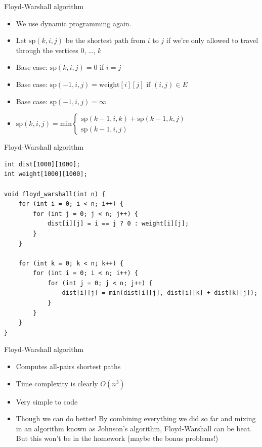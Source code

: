 \documentclass{beamer}
\begin{document}
\begin{frame}[plain]{Floyd-Warshall algorithm}
    \begin{itemize}
        \item We use dynamic programming again.
        \vspace{10pt}
    \item Let $\mathrm{sp}(k, i, j)$ be the shortest path from $i$ to $j$ if we're only allowed to travel through the vertices $0$, \ldots, $k$
        \vspace{5pt}
    \item Base case: $\mathrm{sp}(k, i, j) = 0$ if $i = j$
    \item Base case: $\mathrm{sp}(-1, i, j) = \mathrm{weight}[i][j]$ if $(i,j) \in E$
    \item Base case: $\mathrm{sp}(-1, i, j) = \infty$
        \vspace{5pt}
    \item $\mathrm{sp}(k, i, j) = \mathrm{min} \left\{
	\begin{array}{l}
        \mathrm{sp}(k - 1, i, k) + \mathrm{sp}(k - 1, k, j) \\
        \mathrm{sp}(k - 1, i, j)
	\end{array}
\right.$
    \end{itemize}
\end{frame}

\begin{frame}{Floyd-Warshall algorithm}
    \begin{verbatim}
int dist[1000][1000];
int weight[1000][1000];

void floyd_warshall(int n) {
    for (int i = 0; i < n; i++) {
        for (int j = 0; j < n; j++) {
            dist[i][j] = i == j ? 0 : weight[i][j];
        }
    }

    for (int k = 0; k < n; k++) {
        for (int i = 0; i < n; i++) {
            for (int j = 0; j < n; j++) {
                dist[i][j] = min(dist[i][j], dist[i][k] + dist[k][j]);
            }
        }
    }
}
    \end{verbatim}
\end{frame}

\begin{frame}[plain]{Floyd-Warshall algorithm}
    \begin{itemize}
\item Computes all-pairs shortest paths
\item Time complexity is clearly $O(n^3)$
\item Very simple to code
\item Though we can do better! By combining everything we did so far and mixing in an algorithm known as Johnson's algorithm, Floyd-Warshall can be beat. But this won't be in the homework (maybe the bonus problems!)
    \end{itemize}
\end{frame}
\end{document}
